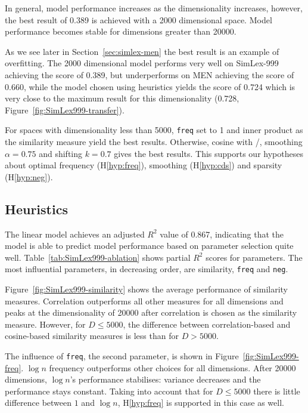 In general, model performance increases as the dimensionality increases, however, the best result of 0.389 is achieved with a 2000 dimensional space. Model performance becomes stable for dimensions greater than 20000.

As we see later in Section~\ref{sec:simlex-men} the best result is an example of overfitting. The 2000 dimensional model performs very well on SimLex-999 achieving the score of 0.389, but underperforms on MEN achieving the score of 0.660, while the model chosen using heuristics yields the score of 0.724 which is very close to the maximum result for this dimensionality (0.728, Figure~\ref{fig:SimLex999-transfer}).

For spaces with dimensionality less than 5000, \texttt{freq} set to 1 and inner product as the similarity measure yield the best results. Otherwise, cosine with \logNSCPMI/, smoothing $\alpha=0.75$ and shifting $k=0.7$ gives the best results. This supports our hypotheses about optimal frequency (H\ref{hyp:freq}), smoothing (H\ref{hyp:cds}) and sparsity (H\ref{hyp:neg}).

\subsection{Heuristics}
\label{sec:heuristics-simlex}





% 

The linear model achieves an adjusted $R^2$ value of 0.867, indicating that the model is able to predict model performance based on parameter selection quite well. Table~\ref{tab:SimLex999-ablation} shows partial $R^2$ scores for parameters. The most influential parameters, in decreasing order, are similarity, \texttt{freq} and \texttt{neg}.


Figure~\ref{fig:SimLex999-similarity} shows the average performance of similarity measures. Correlation outperforms all other measures for all dimensions and peaks at the dimensionality  of 20000 after correlation is chosen as the similarity measure. However, for $D \leq 5000$, the difference between correlation-based and cosine-based similarity measures is less than for $D > 5000$.

The influence of \texttt{freq}, the second parameter, is shown in Figure~\ref{fig:SimLex999-freq}. $\log n$ frequency outperforms other choices for all dimensions. After 20000 dimensions, $\log n$'s performance stabilises: variance decreases and the performance stays constant. Taking into account that for $D \leq 5000$ there is little difference between $1$ and $\log n$, H\ref{hyp:freq} is supported in this case as well.
%
%

